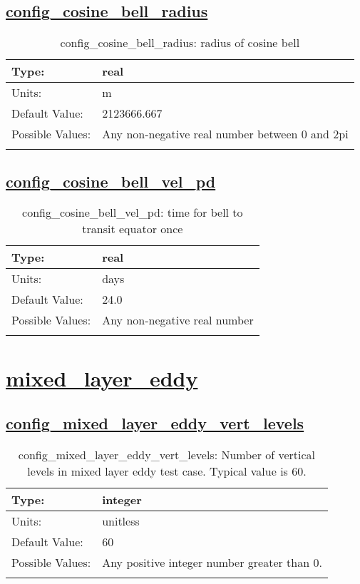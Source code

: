 \subsection[config\_cosine\_bell\_radius]{\hyperref[sec:nm_tab_cosine_bell]{config\_cosine\_bell\_radius}}
\label{subsec:nm_sec_config_cosine_bell_radius}
\begin{center}
\begin{longtable}{| p{2.0in} || p{4.0in} |}
    \hline
    Type: & real \\
    \hline
    Units: & \si{m} \\
    \hline
    Default Value: & 2123666.667 \\
    \hline
    Possible Values: & Any non-negative real number between 0 and 2pi \\
    \hline
    \caption{config\_cosine\_bell\_radius: radius of cosine bell}
\end{longtable}
\end{center}
\subsection[config\_cosine\_bell\_vel\_pd]{\hyperref[sec:nm_tab_cosine_bell]{config\_cosine\_bell\_vel\_pd}}
\label{subsec:nm_sec_config_cosine_bell_vel_pd}
\begin{center}
\begin{longtable}{| p{2.0in} || p{4.0in} |}
    \hline
    Type: & real \\
    \hline
    Units: & \si{days} \\
    \hline
    Default Value: & 24.0 \\
    \hline
    Possible Values: & Any non-negative real number \\
    \hline
    \caption{config\_cosine\_bell\_vel\_pd: time for bell to transit equator once}
\end{longtable}
\end{center}
\section[mixed\_layer\_eddy]{\hyperref[sec:nm_tab_mixed_layer_eddy]{mixed\_layer\_eddy}}
\label{sec:nm_sec_mixed_layer_eddy}
\subsection[config\_mixed\_layer\_eddy\_vert\_levels]{\hyperref[sec:nm_tab_mixed_layer_eddy]{config\_mixed\_layer\_eddy\_vert\_levels}}
\label{subsec:nm_sec_config_mixed_layer_eddy_vert_levels}
\begin{center}
\begin{longtable}{| p{2.0in} || p{4.0in} |}
    \hline
    Type: & integer \\
    \hline
    Units: & \si{unitless} \\
    \hline
    Default Value: & 60 \\
    \hline
    Possible Values: & Any positive integer number greater than 0. \\
    \hline
    \caption{config\_mixed\_layer\_eddy\_vert\_levels: Number of vertical levels in mixed layer eddy test case. Typical value is 60.}
\end{longtable}
\end{center}
